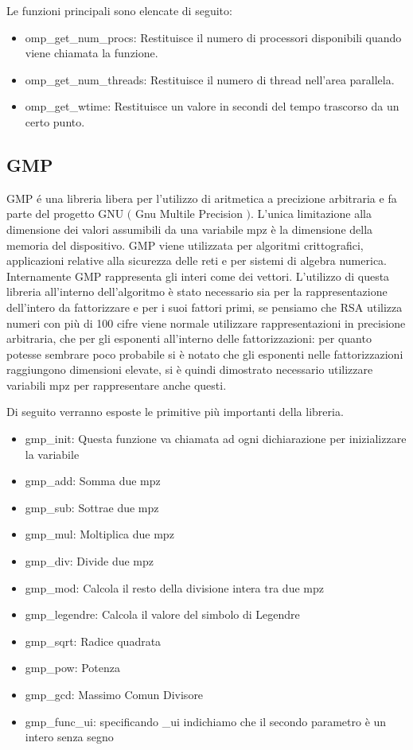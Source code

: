 \begin{fushleft}
Le funzioni principali sono elencate di seguito:
\begin{itemize}
\item omp\_get\_num\_procs: Restituisce il numero di processori disponibili quando viene chiamata la funzione. 
\item omp\_get\_num\_threads: Restituisce il numero di thread nell'area parallela.
\item omp\_get\_wtime: Restituisce un valore in secondi del tempo trascorso da un certo punto. 
\end{itemize}

\subsection{GMP}
\label{subsec:gmp}
GMP \'{e} una libreria libera per l'utilizzo di aritmetica a precizione arbitraria e fa parte
del progetto GNU $($ Gnu Multile Precision $)$.
L'unica limitazione alla dimensione dei valori assumibili da una variabile mpz è la dimensione della
memoria del dispositivo.
GMP viene utilizzata per algoritmi crittografici, applicazioni relative alla sicurezza delle reti
e per sistemi di algebra numerica.
Internamente GMP rappresenta gli interi come dei vettori.
L'utilizzo di questa libreria all'interno dell'algoritmo è stato necessario sia per la rappresentazione
dell'intero da fattorizzare e per i suoi fattori primi, se pensiamo che RSA utilizza numeri con più
di 100 cifre viene normale utilizzare rappresentazioni in precisione arbitraria, che per gli esponenti
all'interno delle fattorizzazioni: per quanto potesse sembrare poco probabile si è notato che gli esponenti 
nelle fattorizzazioni raggiungono dimensioni elevate, si è quindi dimostrato necessario utilizzare variabili
mpz per rappresentare anche questi.

Di seguito verranno esposte le primitive più importanti della libreria.
\begin{itemize}
\item gmp\_init: Questa funzione va chiamata ad ogni dichiarazione per inizializzare la variabile
\item gmp\_add: Somma due mpz
\item gmp\_sub: Sottrae due mpz
\item gmp\_mul: Moltiplica due mpz
\item gmp\_div: Divide due mpz
\item gmp\_mod: Calcola il resto della divisione intera tra due mpz
\item gmp\_legendre: Calcola il valore del simbolo di Legendre
\item gmp\_sqrt: Radice quadrata
\item gmp\_pow: Potenza
\item gmp\_gcd: Massimo Comun Divisore
\item gmp\_func\_ui: specificando \_ui indichiamo che il secondo parametro è un intero senza segno
\end{itemize}




\end{fushleft}